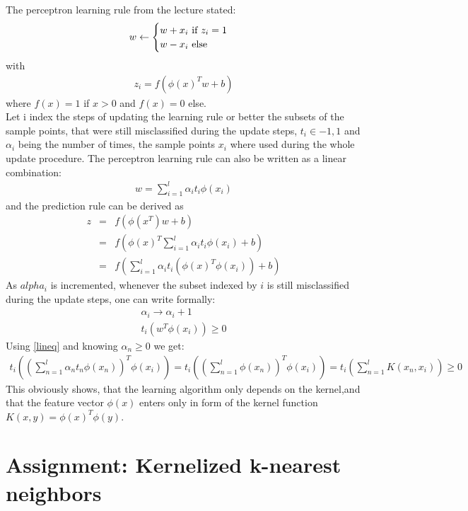 \documentclass{article}
\begin{document}
The perceptron learning rule from the lecture stated:
\begin{eqnarray}
w \leftarrow 
\begin{cases}
w + x_i $ if $ z_i  = 1 \\
w - x_i $ else$
\end{cases}
\end{eqnarray}
with
\begin{eqnarray}
z_i = f(\phi(x)^Tw +b)
\end{eqnarray}
where $f(x)=1$ if $x>0$ and $f(x)=0$ else.\\
Let i index the steps of updating the learning rule or better the subsets of the sample points, that were still misclassified during the update steps, $t_i \in {-1,1}$ and $\alpha_i$ being the number of times, the sample points $x_i$ where used during the whole update procedure. The perceptron learning rule can also be written as a linear combination:
\begin{eqnarray}
w = \sum_{i=1}^{l} \alpha_i t_i \phi(x_i)
\label{lineq}
\end{eqnarray}
and the prediction rule can be derived as 
\begin{eqnarray}
z &=& f(\phi(x^T) w+b)\\
&=& f(\phi(x)^T \sum_{i=1}^{l} \alpha_i t_i \phi(x_i) +b)\\
&=& f(\sum_{i=1}^{l} \alpha_i t_i (\phi(x)^T \phi(x_i)) +b)
\end{eqnarray}
As $alpha_i$ is incremented, whenever the subset indexed by $i$ is still misclassified during the update steps, one can write formally:
\begin{eqnarray}
\alpha_i \rightarrow \alpha_i +1\\
t_i (w^T \phi(x_i)) \geq 0 
\end{eqnarray}
Using \ref{lineq} and knowing $\alpha_n \geq 0$ we get:
\begin{eqnarray}
t_i \left( \left( \sum_{n=1}^{l} \alpha_n t_n \phi(x_n)\right)^T \phi(x_i) \right) = 
t_i \left( \left( \sum_{n=1}^{l} \phi(x_n)\right)^T \phi(x_i)\right) =
t_i\left(\sum_{n=1}^{l} K(x_n,x_i)\right) \geq 0 
\end{eqnarray}
This obviously shows, that the learning algorithm only depends on the kernel,and  that the feature vector $\phi(x)$ enters only in form of the kernel function $K(x,y) = \phi(x)^T\phi(y)$.


\section{Assignment: Kernelized k-nearest neighbors}
\end{document}
